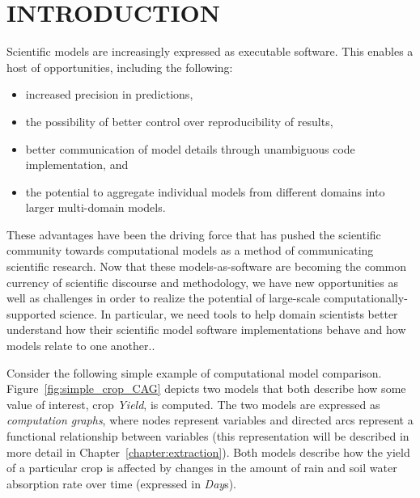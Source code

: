 \chapter{INTRODUCTION\label{chapter:introduction}}
Scientific models are increasingly expressed as executable software.
This enables a host of opportunities, including the following:
\begin{itemize}
\item increased precision in predictions,
\item the possibility of better control over reproducibility of results,
\item better communication of model details through unambiguous code implementation, and
\item the potential to aggregate individual models from different domains into larger multi-domain models.
\end{itemize}
These advantages have been the driving force that has pushed the scientific community towards computational models as a method of communicating scientific research.
Now that these models-as-software are becoming the common currency of scientific discourse and methodology, we have new opportunities as well as challenges in order to realize the potential of large-scale computationally-supported science.
In particular, we need tools to help domain scientists better understand how their scientific model software implementations behave and how models relate to one another..

Consider the following simple example of computational model comparison. Figure~\ref{fig:simple_crop_CAG} depicts two models that both describe how some value of interest, crop \emph{Yield}, is computed. The two models are expressed as \emph{computation graphs}, where nodes represent variables and directed arcs represent a functional relationship between variables (this representation will be described in more detail in Chapter~\ref{chapter:extraction}).
Both models describe how the yield of a particular crop is affected by changes in the amount of rain and soil water absorption rate over time (expressed in \emph{Day}s).

